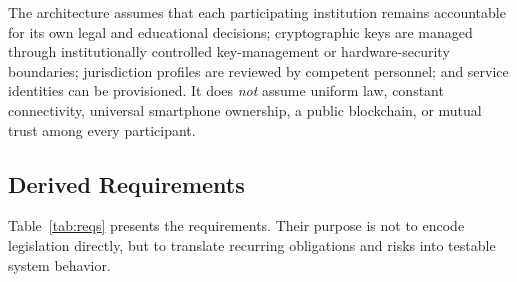 \documentclass[journal]{IEEEtran}
\begin{document}
The architecture assumes that each participating institution remains accountable for its own legal and educational decisions; cryptographic keys are managed through institutionally controlled key-management or hardware-security boundaries; jurisdiction profiles are reviewed by competent personnel; and service identities can be provisioned. It does \emph{not} assume uniform law, constant connectivity, universal smartphone ownership, a public blockchain, or mutual trust among every participant.

\subsection{Derived Requirements}
Table~\ref{tab:reqs} presents the requirements. Their purpose is not to encode legislation directly, but to translate recurring obligations and risks into testable system behavior.
\end{document}
